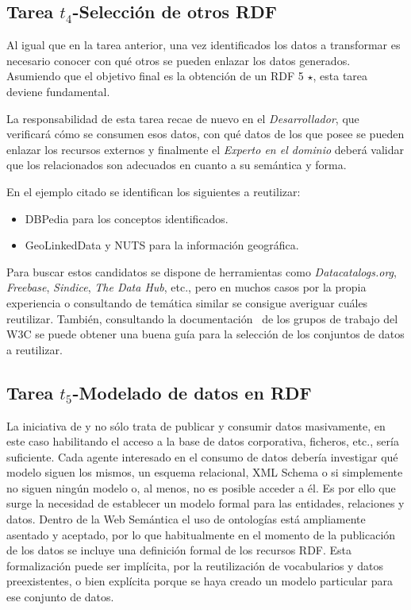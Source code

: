 \subsection{Tarea $t_4$-Selección de otros \datasets RDF}
Al igual que en la tarea anterior, una vez identificados los datos a transformar 
es necesario conocer con qué otros \datasets se pueden enlazar los datos generados. Asumiendo que 
el objetivo final es la obtención de un \dataset \gls{RDF} 5 $\star$, esta tarea deviene fundamental.

La responsabilidad de esta tarea recae de nuevo en el \textit{Desarrollador}, que verificará cómo se
consumen esos datos, con qué datos de los que posee se pueden enlazar los recursos externos y finalmente
el \textit{Experto en el dominio} deberá validar que los \datasets relacionados son adecuados en cuanto a su semántica
y forma.

En el ejemplo citado se identifican los siguientes \datasets a reutilizar:
\begin{itemize}
 \item DBPedia para los conceptos identificados.
 \item GeoLinkedData y \gls{NUTS} para la información geográfica.
\end{itemize}

Para buscar estos \datasets candidatos se dispone de herramientas como \textit{Datacatalogs.org}, \textit{Freebase}, \textit{Sindice}, 
\textit{The Data Hub}, etc., pero en muchos casos por la propia experiencia o consultando \datasets de temática 
similar se consigue averiguar cuáles reutilizar. También, consultando la documentación~\cite{dcat-w3c} de los grupos de trabajo del \gls{W3C} 
se puede obtener una buena guía para la selección de los conjuntos de datos a reutilizar.

\subsection{Tarea $t_5$-Modelado de datos en RDF}
La iniciativa de \linkeddata y \lod no sólo trata de publicar y consumir datos masivamente, en este caso habilitando 
el acceso a la base de datos corporativa, ficheros, etc., sería suficiente. Cada agente interesado en el consumo de datos 
debería investigar qué modelo siguen los mismos, un esquema relacional, \gls{XML Schema} o si simplemente
no siguen ningún modelo o, al menos, no es posible acceder a él. Es por ello que surge la necesidad
de establecer un modelo formal para las entidades, relaciones y datos. Dentro de la Web Semántica el uso
de ontologías está ampliamente asentado y aceptado, por lo que habitualmente en el momento de la publicación de los datos
se incluye una definición formal de los recursos \gls{RDF}. Esta formalización puede
ser implícita, por la reutilización de vocabularios y datos preexistentes, o bien explícita porque se haya creado un modelo particular 
para ese conjunto de datos.

